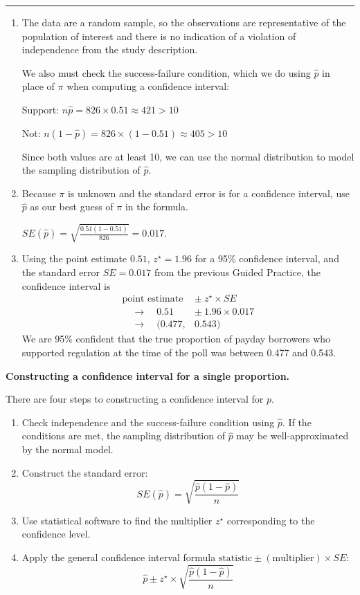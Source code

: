 \documentclass[
  10pt,
  openany]{book}
\providecommand{\tightlist}{%
  \setlength{\itemsep}{0pt}\setlength{\parskip}{0pt}}
\theoremstyle{definition}
\theoremstyle{definition}
\theoremstyle{definition}
\theoremstyle{definition}
\theoremstyle{remark}
\begin{document}
\begin{center}\rule{0.5\linewidth}{0.5pt}\end{center}

\begin{enumerate}
\def\labelenumi{\arabic{enumi}.}
\item
  The data are a random sample, so the observations are representative of the population of interest and there is no indication of a violation of independence from the study description.

  We also must check the success-failure condition, which we do using \(\hat{p}\) in place of \(\pi\) when computing a confidence interval:

  Support: \(n \hat{p} = 826 \times 0.51 \approx 421 > 10\)

  Not: \(n (1 - \hat{p}) = 826 \times (1 - 0.51) \approx 405 > 10\)

  Since both values are at least 10, we can use the normal distribution to model the sampling distribution of \(\hat{p}\).
\item
  Because \(\pi\) is unknown and the standard error is for a confidence interval, use \(\hat{p}\) as our best guess of \(\pi\) in the formula.

  \(SE(\hat{p}) = \sqrt{\frac{0.51 (1 - 0.51)} {826}} = 0.017\).
\item
  Using the point estimate \(0.51\), \(z^{\star} = 1.96\) for a 95\% confidence interval, and the standard error \(SE = 0.017\) from the previous Guided Practice, the confidence interval is \begin{align*}
    \text{point estimate} &\pm\ z^{\star} \times SE \\
     \quad\to\quad
     0.51 \ &\pm\ 1.96 \times 0.017 \\
     \quad\to\quad
     (0.477, &0.543)
    \end{align*} We are 95\% confident that the true proportion of payday borrowers who supported regulation at the time of the poll was between 0.477 and 0.543.
\end{enumerate}

\textbf{Constructing a confidence interval for a single proportion.}

There are four steps to constructing a confidence interval for \(p\).

\begin{enumerate}
\def\labelenumi{\arabic{enumi}.}
\tightlist
\item
  Check independence and the success-failure condition using \(\hat{p}\). If the conditions are met, the sampling distribution of \(\hat{p}\) may be well-approximated by the normal model.
\item
  Construct the standard error: \[
   SE(\hat{p}) = \sqrt{\frac{\hat{p}(1-\hat{p})}{n}}
    \]
\item
  Use statistical software to find the multiplier \(z^{\star}\) corresponding to the confidence level.
\item
  Apply the general confidence interval formula \(\mbox{statistic} \pm (\mbox{multiplier}) \times SE\): \[
   \hat{p} \pm z^{\star}\times \sqrt{\frac{\hat{p}(1-\hat{p})}{n}}
    \]
\end{enumerate}
\end{document}
